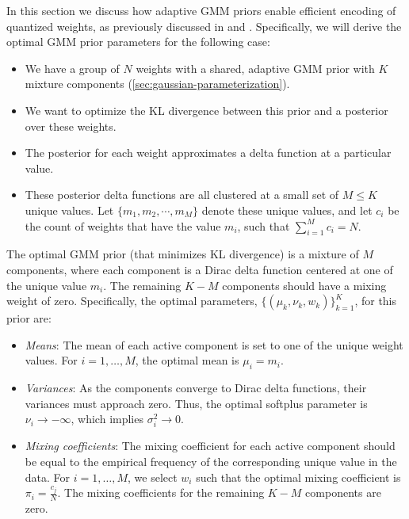 In this section we discuss how adaptive GMM priors enable efficient encoding of quantized weights, as previously discussed in \citet{ullrich2017soft} and \citet{nowlan1992simplifying}.
Specifically, we will derive the optimal GMM prior parameters for the following case:
\begin{itemize}
    \item We have a group of $N$ weights with a shared, adaptive GMM prior with $K$ mixture components (\ref{sec:gaussian-parameterization}).
    \item We want to optimize the KL divergence between this prior and a posterior over these weights.
    \item The posterior for each weight approximates a delta function at a particular value.
    \item These posterior delta functions are all clustered at a small set of $M \leq K$ unique values. Let $\{m_1, m_2, \cdots, m_M\}$ denote these unique values, and let $c_i$ be the count of weights that have the value $m_i$, such that $\sum_{i=1}^M c_i = N$.
\end{itemize}
The optimal GMM prior (that minimizes KL divergence) is a mixture of $M$ components, where each component is a Dirac delta function centered at one of the unique value $m_i$. The remaining $K-M$ components should have a mixing weight of zero. Specifically, the optimal parameters, $\{(\mu_k, \nu_k, w_k)\}_{k=1}^K$, for this prior are:
\begin{itemize}
    \item \emph{Means}: The mean of each active component is set to one of the unique weight values. For $i = 1, \dots, M$, the optimal mean is $\mu_i = m_i$.
    \item \emph{Variances}: As the components converge to Dirac delta functions, their variances must approach zero. Thus, the optimal softplus parameter is $\nu_i \to -\infty$, which implies $\sigma_i^2 \to 0$.
    \item \emph{Mixing coefficients}: The mixing coefficient for each active component should be equal to the empirical frequency of the corresponding unique value in the data. For $i = 1, \dots, M$, we select $w_i$ such that the optimal mixing coefficient is $\pi_i = \frac{c_j}{N}$. The mixing coefficients for the remaining $K-M$ components are zero.
\end{itemize}

